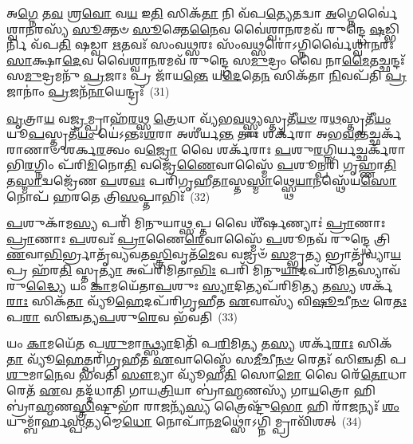 {\anuvakamend[{\-\ul{𑌚} \ul{𑌭}\-\-\ul{𑌵}\-\-\ul{𑌤𑍍𑌯𑍇}\-𑌤𑌾\-\ul{𑌵}\-𑌦𑍍𑌵𑍈 𑌪𑍁𑌰𑍁᳴𑌷𑍇 \ul{𑌵𑍀}\-𑌰𑍍𑌯𑌂᳴ 𑌯\-\ul{𑌤𑍍𑌕𑍃}\-𑌷𑍍𑌟𑌞𑍍𑌚𑌾𑌕𑍃᳴𑌷𑍍𑌟𑌂 \ul{𑌚} 𑌦𑌿𑌖𑍍𑌸𑍀𑌤𑌾᳴ 𑌅\-\ul{𑌗𑍍𑌨𑌿}\-𑌚𑌿𑌦\-\ul{𑌵} 𑌪𑌞𑍍𑌚᳴𑌵𑌿𑍞𑌶𑌤𑌿𑌶𑍍𑌚}]}%

𑌅\-\ul{𑌗𑍍𑌨𑍇} 𑌤\-\ul{𑌵} 𑌶𑍍𑌰\-\ul{𑌵𑍋} 𑌵\-\ul{𑌯} 𑌇\-\ul{𑌤𑌿} 𑌸𑌿𑌕᳴\-\ul{𑌤𑌾} 𑌨𑌿 𑌵᳴𑌪\-\ul{𑌤𑍍𑌯𑍇}\-𑌤𑌦𑍍𑌵𑌾 \ul{𑌅}\-𑌗𑍍𑌨𑍇𑌰𑍍𑌵𑍈॑𑌶𑍍𑌵𑌾\-\ul{𑌨}\-𑌰𑌸𑍍𑌯᳴ \ul{𑌸𑍂}\-𑌕𑍍𑌤𑍞 \ul{𑌸𑍂}\-𑌕𑍍𑌤𑍇\-\ul{𑌨𑍈}\-𑌵 𑌵𑍈॑𑌶𑍍𑌵𑌾\-\ul{𑌨}\-𑌰𑌮𑌵᳴ 𑌰𑍁𑌨𑍍𑌦𑍍𑌧𑍇 \ul{𑌷}\-𑌡𑍍𑌭𑌿𑌰𑍍𑌨𑌿 𑌵᳴𑌪\-\ul{𑌤𑌿} 𑌷𑌡𑍍𑌵𑌾 \ul{𑌋}\-𑌤𑌵𑌃᳴ 𑌸𑌂𑌵\-\ul{𑌥𑍍𑌸}\-𑌰𑌃 𑌸𑌂᳴𑌵\-\ul{𑌥𑍍𑌸}\-𑌰𑍋॑\-𑌽𑌗𑍍𑌨𑌿𑌰𑍍𑌵𑍈॑𑌶𑍍𑌵𑌾\-\ul{𑌨}\-𑌰𑌃 \ul{𑌸𑌾}\-𑌕𑍍𑌷𑌾\-\ul{𑌦𑍇}\-𑌵 𑌵𑍈॑𑌶𑍍𑌵𑌾\-\ul{𑌨}\-𑌰𑌮𑌵᳴ 𑌰𑍁𑌨𑍍𑌦𑍍𑌧𑍇 𑌸\-\ul{𑌮𑍁}\-𑌦𑍍𑌰𑌂 𑌵𑍈 𑌨𑌾\-\ul{𑌮𑍈}\-𑌤𑌚𑍍𑌛𑌨𑍍𑌦𑌃᳴ 𑌸\-\ul{𑌮𑍁}\-𑌦𑍍𑌰𑌮𑌨𑍁᳴ \ul{𑌪𑍍𑌰}\-𑌜𑌾𑌃 𑌪𑍍𑌰 𑌜𑌾᳴𑌯\-\ul{𑌨𑍍𑌤𑍇} 𑌯\-\ul{𑌦𑍇}\-𑌤𑍇\-\ul{𑌨} 𑌸𑌿𑌕᳴𑌤𑌾 \ul{𑌨𑌿}\-𑌵𑌪᳴𑌤𑌿 \ul{𑌪𑍍𑌰}\-𑌜𑌾𑌨𑌾𑌂॑ \ul{𑌪𑍍𑌰}\-𑌜𑌨᳴\-\ul{𑌨𑌾}\-𑌯𑍇𑌨𑍍𑌦𑍍𑌰𑌃᳴~(31)

\-\ul{𑌵𑍃}\-𑌤𑍍𑌰𑌾\-\ul{𑌯} 𑌵\-\ul{𑌜𑍍𑌰}\-𑌮𑍍𑌪𑍍𑌰𑌾𑌹᳴\-\ul{𑌰}\-𑌥𑍍𑌸 \ul{𑌤𑍍𑌰𑍇}\-𑌧𑌾 𑌵𑍍𑌯᳴𑌭\-\ul{𑌵}\-𑌥𑍍𑌸𑍍𑌫𑍍𑌯𑌸𑍍𑌤𑍃𑌤𑍀᳴\-\ul{𑌯}\-\-\ul{𑍞} 𑌰\-\ul{𑌥}\-𑌸𑍍𑌤𑍃𑌤𑍀᳴\-\ul{𑌯𑌂} 𑌯𑍂\-\ul{𑌪}\-𑌸𑍍𑌤𑍃𑌤𑍀᳴\-\ul{𑌯𑌂} 𑌯𑍇॑\-𑌽𑌨𑍍𑌤𑌃\-\ul{𑌶}\-𑌰𑌾 𑌅𑌶𑍀॑𑌰𑍍𑌯\-\ul{𑌨𑍍𑌤} 𑌤𑌾𑌃 𑌶𑌰𑍍𑌕᳴𑌰𑌾 𑌅𑌭\-\ul{𑌵}\-𑌨𑍍𑌤𑌚𑍍𑌛𑌰𑍍𑌕᳴𑌰𑌾𑌣𑌾𑍞 𑌶𑌰𑍍𑌕\-\ul{𑌰}\-𑌤𑍍𑌵𑌂 𑌵\-\ul{𑌜𑍍𑌰𑍋} 𑌵𑍈 𑌶𑌰𑍍𑌕᳴𑌰𑌾𑌃 \ul{𑌪}\-𑌶𑍁\-\ul{𑌰}\-𑌗𑍍𑌨𑌿𑌰𑍍𑌯𑌚𑍍𑌛𑌰𑍍𑌕᳴𑌰𑌾𑌭𑌿\-\ul{𑌰}\-𑌗𑍍𑌨𑌿𑌂 𑌪᳴𑌰𑌿\-\ul{𑌮𑌿}\-𑌨𑍋\-\ul{𑌤𑌿} 𑌵𑌜𑍍𑌰𑍇᳴\-\ul{𑌣𑍈}\-𑌵𑌾𑌸𑍍𑌮𑍈᳴ \ul{𑌪}\-𑌶𑍂𑌨𑍍𑌪𑌰𑌿᳴ 𑌗𑍃𑌹𑍍𑌣𑌾\-\ul{𑌤𑌿} 𑌤\-\ul{𑌸𑍍𑌮𑌾}\-𑌦𑍍𑌵𑌜𑍍𑌰𑍇᳴𑌣 \ul{𑌪}\-𑌶\-\ul{𑌵𑌃} 𑌪𑌰𑌿᳴𑌗𑍃𑌹𑍀\-\ul{𑌤𑌾}\-𑌸𑍍𑌤\-\ul{𑌸𑍍𑌮𑌾}\-𑌥𑍍𑌸𑍍𑌥𑍇\-\ul{𑌯𑌾}\-𑌨𑌸𑍍𑌥𑍇᳴𑌯\-\ul{𑌸𑍋} 𑌨𑍋𑌪᳴ 𑌹𑌰𑌤𑍇 𑌤𑍍𑌰𑌿\-\ul{𑌸}\-𑌪𑍍𑌤𑌾𑌭𑌿𑌃᳴~(32)

\-\ul{𑌪}\-𑌶𑍁𑌕𑌾᳴𑌮\-\ul{𑌸𑍍𑌯} 𑌪𑌰𑌿᳴ 𑌮𑌿𑌨𑍁𑌯𑌾\-\ul{𑌥𑍍𑌸}\-𑌪𑍍𑌤 𑌵𑍈 𑌶𑍀᳴𑌰𑍍\mbox{}\-\ul{𑌷}\-𑌣𑍍𑌯𑌾𑌃॑ \ul{𑌪𑍍𑌰𑌾}\-𑌣𑌾𑌃 \ul{𑌪𑍍𑌰𑌾}\-𑌣𑌾𑌃 \ul{𑌪}\-𑌶𑌵𑌃᳴ \ul{𑌪𑍍𑌰𑌾}\-𑌣𑍈\-\ul{𑌰𑍇}\-𑌵𑌾𑌸𑍍𑌮𑍈᳴ \ul{𑌪}\-𑌶𑍂𑌨𑌵᳴ 𑌰𑍁𑌨𑍍𑌦𑍍𑌧𑍇 𑌤𑍍𑌰𑌿\-\ul{𑌣}\-𑌵𑌾\-\ul{𑌭𑌿}\-\-𑌰𑍍𑌭𑍍𑌰𑌾𑌤𑍃᳴𑌵𑍍𑌯𑌵𑌤\-\ul{𑌸𑍍𑌤𑍍𑌰𑌿}\-𑌵𑍃𑌤᳴\-\ul{𑌮𑍇}\-𑌵 𑌵𑌜𑍍𑌰𑍞᳴ \ul{𑌸}\-𑌮𑍍𑌭𑍃\-\ul{𑌤𑍍𑌯} 𑌭𑍍𑌰𑌾𑌤𑍃᳴𑌵𑍍𑌯𑌾\-\ul{𑌯} 𑌪𑍍𑌰 𑌹᳴𑌰\-\ul{𑌤𑌿} 𑌸𑍍𑌤𑍃\-\ul{𑌤𑍍𑌯𑌾} 𑌅𑌪᳴𑌰𑌿𑌮𑌿𑌤𑌾\-\ul{𑌭𑌿𑌃} 𑌪𑌰𑌿᳴ 𑌮𑌿𑌨𑍁\-\ul{𑌯𑌾}\-𑌦𑌪᳴𑌰𑌿𑌮𑌿\-\ul{𑌤}\-𑌸𑍍𑌯𑌾𑌵᳴𑌰𑍁\-\ul{𑌦𑍍𑌧𑍍𑌯𑍈} 𑌯𑌂 \ul{𑌕𑌾}\-𑌮𑌯𑍇᳴𑌤𑌾\-\ul{𑌪}\-𑌶𑍁𑌃 \ul{𑌸𑍍𑌯𑌾}\-𑌦𑌿𑌤𑍍𑌯𑌪᳴𑌰𑌿𑌮𑌿\-\ul{𑌤𑍍𑌯} 𑌤\-\ul{𑌸𑍍𑌯} 𑌶𑌰𑍍𑌕᳴\-\ul{𑌰𑌾𑌃} 𑌸𑌿𑌕᳴\-\ul{𑌤𑌾} 𑌵𑍍𑌯𑍂᳴\-\ul{𑌹𑍇}\-𑌦𑌪᳴𑌰𑌿𑌗𑍃𑌹𑍀𑌤 \ul{𑌏}\-𑌵𑌾𑌸𑍍𑌯᳴ 𑌵𑌿\-\ul{𑌷𑍂}\-𑌚𑍀\-\ul{𑌨}\-\-\ul{𑍞} 𑌰𑍇\-\ul{𑌤𑌃} 𑌪\-\ul{𑌰𑌾} 𑌸𑌿𑌞𑍍𑌚𑌤𑍍𑌯\-\ul{𑌪}\-𑌶𑍁\-\ul{𑌰𑍇}\-𑌵 𑌭᳴𑌵𑌤𑌿~(33)

𑌯𑌂 \ul{𑌕𑌾}\-𑌮𑌯𑍇᳴𑌤 𑌪\-\ul{𑌶𑍁}\-𑌮𑌾\-\ul{𑌨𑍍𑌥𑍍𑌸𑍍𑌯𑌾}\-𑌦𑌿𑌤𑌿᳴ 𑌪\-\ul{𑌰𑌿}\-𑌮𑌿\-\ul{𑌤𑍍𑌯} 𑌤\-\ul{𑌸𑍍𑌯} 𑌶𑌰𑍍𑌕᳴\-\ul{𑌰𑌾𑌃} 𑌸𑌿𑌕᳴\-\ul{𑌤𑌾} 𑌵𑍍𑌯𑍂᳴\-\ul{𑌹𑍇}\-𑌤𑍍𑌪𑌰𑌿᳴𑌗𑍃𑌹𑍀𑌤 \ul{𑌏}\-𑌵𑌾𑌸𑍍𑌮𑍈᳴ 𑌸\-\ul{𑌮𑍀}\-𑌚𑍀\-\ul{𑌨}\-\-\ul{𑍞} 𑌰𑍇𑌤𑌃᳴ 𑌸𑌿𑌞𑍍𑌚𑌤𑌿 𑌪\-\ul{𑌶𑍁}\-𑌮𑌾\-\ul{𑌨𑍇}\-𑌵 𑌭᳴𑌵𑌤𑌿 \ul{𑌸𑍗}\-𑌮𑍍𑌯𑌾 𑌵𑍍𑌯𑍂᳴𑌹\-\ul{𑌤𑌿} 𑌸𑍋\-\ul{𑌮𑍋} 𑌵𑍈 𑌰𑍇᳴\-\ul{𑌤𑍋}\-𑌧𑌾 𑌰𑍇𑌤᳴ \ul{𑌏}\-𑌵 𑌤𑌦𑍍𑌦᳴𑌧𑌾𑌤𑌿 𑌗𑌾𑌯\-\ul{𑌤𑍍𑌰𑌿}\-𑌯𑌾 𑌬𑍍𑌰𑌾॑\-\ul{𑌹𑍍𑌮}\-𑌣𑌸𑍍𑌯᳴ 𑌗𑌾\-\ul{𑌯}\-𑌤𑍍𑌰𑍋 𑌹𑌿 𑌬𑍍𑌰𑌾॑\-\ul{𑌹𑍍𑌮}\-𑌣\-\ul{𑌸𑍍𑌤𑍍𑌰𑌿}\-𑌷𑍍𑌟𑍁𑌭𑌾᳴ 𑌰𑌾\-\ul{𑌜}\-𑌨𑍍𑌯᳴\-\ul{𑌸𑍍𑌯} 𑌤𑍍𑌰𑍈𑌷𑍍𑌟𑍁᳴\-\ul{𑌭𑍋} 𑌹𑌿 𑌰𑌾᳴\-\ul{𑌜}\-𑌨𑍍𑌯𑌃᳴ \ul{𑌶𑌂} 𑌯𑍁𑌮𑍍𑌬𑌾᳴𑌰𑍍\mbox{}𑌹\-\ul{𑌸𑍍𑌪}\-𑌤𑍍𑌯𑌮𑍍𑌮𑍇\-\ul{𑌧𑍋} 𑌨𑍋𑌪𑌾᳴𑌨\-\ul{𑌮}\-𑌥𑍍𑌸𑍋॑\-𑌽𑌗𑍍𑌨𑌿𑌮𑍍𑌪𑍍𑌰𑌾𑌵𑌿᳴𑌶𑌤𑍍~(34)

